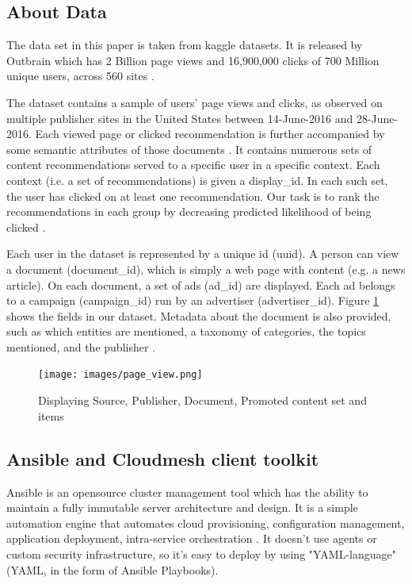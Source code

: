 \documentclass[9pt,twocolumn,twoside]{../../styles/osajnl}
\begin{document}
\subsection{About Data}
The data set in this paper is taken from kaggle datasets. It is released by Outbrain which has 2 Billion page views and 16,900,000 clicks of 700 Million unique users, across 560 sites \cite{kaggle-outbrain}.

The dataset contains a sample of users’ page views and clicks, as observed on multiple publisher sites in the United States between 14-June-2016 and 28-June-2016. Each viewed page or clicked recommendation is further accompanied by some semantic attributes of those documents \cite{kaggle-outbrain}. It contains numerous sets of content recommendations served to a specific user in a specific context. Each context (i.e. a set of recommendations) is given a display\_id. In each such set, the user has clicked on at least one recommendation. Our task is to rank the recommendations in each group by decreasing predicted likelihood of being clicked \cite{kaggle-outbrain}.

Each user in the dataset is represented by a unique id (uuid). A person can view a document (document\_id), which is simply a web page with content (e.g.  a news article). On each document, a set of ads (ad\_id) are displayed. Each ad belongs to a campaign (campaign\_id) run by an advertiser (advertiser\_id). Figure \ref{fig:OutbrainData} shows the fields in our dataset. Metadata about the document is also provided, such as which entities are mentioned, a taxonomy of categories, the topics mentioned, and the publisher \cite{kaggle-outbrain}.

\begin{figure}[hptb]
\centering
\texttt{[image: images/page\_view.png]}
\caption{Displaying Source, Publisher, Document, Promoted content set and items \cite{kaggle-outbrain}}
\label{fig:OutbrainData}
\end{figure}

\subsection{Ansible and Cloudmesh client toolkit}
Ansible is an opensource cluster management tool which has the ability to maintain a fully immutable server architecture and design. It is a simple automation engine that automates cloud provisioning, configuration management, application deployment, intra-service orchestration \cite{www-ansible-work}. It doesn't use agents or custom security infrastructure, so it's easy to deploy by using "YAML-language" (YAML, in the form of Ansible Playbooks). 
\end{document}
